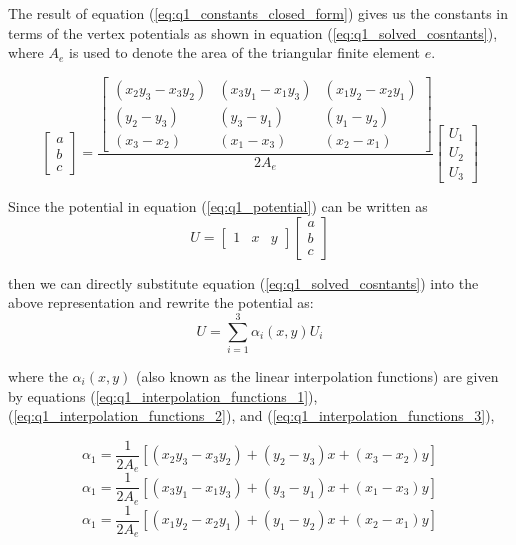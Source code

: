 \documentclass[11pt]{amsart}
\begin{document}
The result of equation (\ref{eq:q1_constants_closed_form}) gives us the constants in terms of the vertex potentials as shown in equation (\ref{eq:q1_solved_cosntants}), where $A_e$ is used to denote the area of the triangular finite element $e$.

\begin{equation}
	\label{eq:q1_solved_cosntants}
        \begin{bmatrix}
            a\\
            b\\
            c
        \end{bmatrix}
        =
        \frac{
            \begin{bmatrix}
                (x_2y_3 - x_3y_2) & (x_3y_1 - x_1y_3) & (x_1y_2 - x_2y_1)\\ 
                (y_2 - y_3) & (y_3 - y_1) & (y_1 - y_2)\\ 
                (x_3 - x_2) & (x_1 - x_3) & (x_2 - x_1) 
            \end{bmatrix}
            }{
            2A_e
        	    }
         \begin{bmatrix}
            U_1\\
            U_2\\
            U_3
        \end{bmatrix}
\end{equation}

Since the potential in equation (\ref{eq:q1_potential}) can be written as 
$$ U =  
        \begin{bmatrix}
            1 & x & y
        \end{bmatrix}
	\begin{bmatrix}
            a\\
            b\\
            c
        \end{bmatrix}
$$

then we can directly substitute equation (\ref{eq:q1_solved_cosntants}) into the above representation and rewrite the potential as: $$ U = \sum^{3}_{i=1} \alpha_i(x,y) U_i$$

where the $\alpha_i(x,y)$ (also known as the linear interpolation functions) are given by equations (\ref{eq:q1_interpolation_functions_1}), (\ref{eq:q1_interpolation_functions_2}), and (\ref{eq:q1_interpolation_functions_3}),

\begin{equation}
    \label{eq:q1_interpolation_functions_1}
    \alpha_1 = \frac{1}{2A_e}[(x_2y_3 - x_3y_2) + (y_2 - y_3)x + (x_3 - x_2)y]
\end{equation}
\begin{equation}
    \label{eq:q1_interpolation_functions_2}
    \alpha_1 = \frac{1}{2A_e}[(x_3y_1 - x_1y_3) + (y_3 - y_1)x + (x_1 - x_3)y]
\end{equation}
\begin{equation}
    \label{eq:q1_interpolation_functions_3}
    \alpha_1 = \frac{1}{2A_e}[(x_1y_2 - x_2y_1) + (y_1 - y_2)x + (x_2 - x_1)y]
\end{equation}
\end{document}
